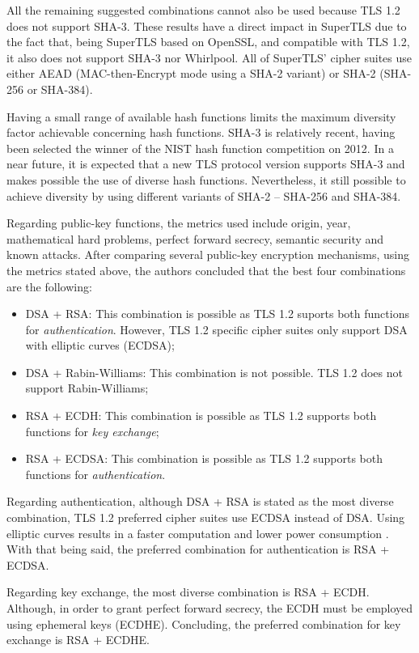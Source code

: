 \documentclass{sig-alternate-05-2015}
\begin{document}
All the remaining suggested combinations cannot also be used because TLS 1.2 does not support SHA-3.
These results have a direct impact in SuperTLS due to the fact that, being SuperTLS based on OpenSSL, and compatible with TLS 1.2, it also does not support SHA-3 nor Whirlpool. All of SuperTLS' cipher suites use either AEAD (MAC-then-Encrypt mode using a SHA-2 variant) or SHA-2 (SHA-256 or SHA-384).

Having a small range of available hash functions limits the maximum diversity factor achievable concerning hash functions.
SHA-3 is relatively recent, having been selected the winner of the NIST hash function competition on 2012. In a near future, it is expected that a new TLS protocol version supports SHA-3 and makes possible the use of diverse hash functions.
Nevertheless, it still possible to achieve diversity by using different variants of SHA-2 -- SHA-256 and SHA-384.

Regarding public-key functions, the metrics used include origin, year, mathematical hard problems, perfect forward secrecy, semantic security and known attacks.
After comparing several public-key encryption mechanisms, using the metrics stated above, the authors concluded that the best four combinations are the following:
\begin{itemize}
\item {DSA + RSA: This combination is possible as TLS 1.2 suports both functions for \textit{authentication}. However, TLS 1.2 specific cipher suites only support DSA with elliptic curves (ECDSA);}
\item {DSA + Rabin-Williams: This combination is not possible. TLS 1.2 does not support Rabin-Williams;}
\item {RSA + ECDH: This combination is possible as TLS 1.2 supports both functions for \textit{key exchange};}
\item {RSA + ECDSA: This combination is possible as TLS 1.2 supports both functions for \textit{authentication}.}
\end{itemize}

Regarding authentication, although DSA + RSA is stated as the most diverse combination, TLS 1.2 preferred cipher suites use ECDSA instead of DSA. Using elliptic curves results in a faster computation and lower power consumption \cite{Gupta02}. With that being said, the preferred combination for authentication is RSA + ECDSA.

Regarding key exchange, the most diverse combination is RSA + ECDH. Although, in order to grant perfect forward secrecy, the ECDH must be employed using ephemeral keys (ECDHE). Concluding, the preferred combination for key exchange is RSA + ECDHE.
\end{document}

